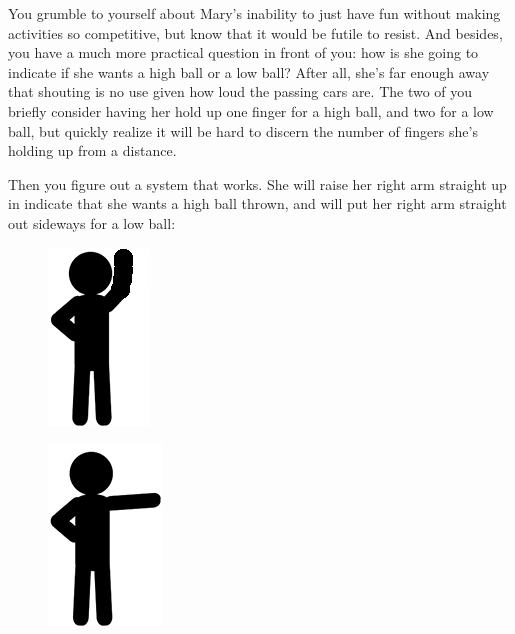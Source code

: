 \documentclass[UTF8]{book}
\begin{document}
\begin{CJK}{UTF8}{gbsn}
You grumble to yourself about Mary's inability to just have fun without making activities so competitive, but know that it would be futile to resist. And besides, you have a much more practical question in front of you: how is she going to indicate if she wants a high ball or a low ball? After all, she's far enough away that shouting is no use given how loud the passing cars are. The two of you briefly consider having her hold up one finger for a high ball, and two for a low ball, but quickly realize it will be hard to discern the number of fingers she's holding up from a distance.

Then you figure out a system that works. She will raise her right arm straight up in indicate that she wants a high ball thrown, and will put her right arm straight out sideways for a low ball:

\begin{figure}[H]
\centering
\captionsetup{labelformat=empty}
\begin{minipage}{.4\textwidth}
  \centering
  \includegraphics[width=.3\linewidth]{stick-figure-arm-raised}
  \label{fig:test1}
\end{minipage}%
\begin{minipage}{.4\textwidth}
  \centering
  \includegraphics[width=.3\linewidth]{stick-figure-arm-sideways}
  \label{fig:test2}
\end{minipage}
\end{figure}


\end{CJK}
\end{document}
